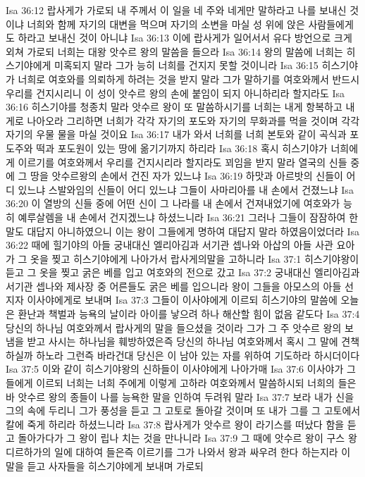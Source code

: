 Isa 36:12  랍사게가 가로되 내 주께서 이 일을 네 주와 네게만 말하라고 나를 보내신 것이냐 너희와 함께 자기의 대변을 먹으며 자기의 소변을 마실 성 위에 앉은 사람들에게도 하라고 보내신 것이 아니냐
Isa 36:13  이에 랍사게가 일어서서 유다 방언으로 크게 외쳐 가로되 너희는 대왕 앗수르 왕의 말씀을 들으라
Isa 36:14  왕의 말씀에 너희는 히스기야에게 미혹되지 말라 그가 능히 너희를 건지지 못할 것이니라
Isa 36:15  히스기야가 너희로 여호와를 의뢰하게 하려는 것을 받지 말라 그가 말하기를 여호와께서 반드시 우리를 건지시리니 이 성이 앗수르 왕의 손에 붙임이 되지 아니하리라 할지라도
Isa 36:16  히스기야를 청종치 말라 앗수르 왕이 또 말씀하시기를 너희는 내게 항복하고 내게로 나아오라 그리하면 너희가 각각 자기의 포도와 자기의 무화과를 먹을 것이며 각각 자기의 우물 물을 마실 것이요
Isa 36:17  내가 와서 너희를 너희 본토와 같이 곡식과 포도주와 떡과 포도원이 있는 땅에 옮기기까지 하리라
Isa 36:18  혹시 히스기야가 너희에게 이르기를 여호와께서 우리를 건지시리라 할지라도 꾀임을 받지 말라 열국의 신들 중에 그 땅을 앗수르왕의 손에서 건진 자가 있느냐
Isa 36:19  하맛과 아르밧의 신들이 어디 있느냐 스발와임의 신들이 어디 있느냐 그들이 사마리아를 내 손에서 건졌느냐
Isa 36:20  이 열방의 신들 중에 어떤 신이 그 나라를 내 손에서 건져내었기에 여호와가 능히 예루살렘을 내 손에서 건지겠느냐 하셨느니라
Isa 36:21  그러나 그들이 잠잠하여 한 말도 대답지 아니하였으니 이는 왕이 그들에게 명하여 대답지 말라 하였음이었더라
Isa 36:22  때에 힐기야의 아들 궁내대신 엘리아김과 서기관 셉나와 아삽의 아들 사관 요아가 그 옷을 찢고 히스기야에게 나아가서 랍사게의말을 고하니라
Isa 37:1  히스기야왕이 듣고 그 옷을 찢고 굵은 베를 입고 여호와의 전으로 갔고
Isa 37:2  궁내대신 엘리아김과 서기관 셉나와 제사장 중 어른들도 굵은 베를 입으니라 왕이 그들을 아모스의 아들 선지자 이사야에게로 보내며
Isa 37:3  그들이 이사야에게 이르되 히스기야의 말씀에 오늘은 환난과 책벌과 능욕의 날이라 아이를 낳으려 하나 해산할 힘이 없음 같도다
Isa 37:4  당신의 하나님 여호와께서 랍사게의 말을 들으셨을 것이라 그가 그 주 앗수르 왕의 보냄을 받고 사시는 하나님을 훼방하였은즉 당신의 하나님 여호와께서 혹시 그 말에 견책하실까 하노라 그런즉 바라건대 당신은 이 남아 있는 자를 위하여 기도하라 하시더이다
Isa 37:5  이와 같이 히스기야왕의 신하들이 이사야에게 나아가매
Isa 37:6  이사야가 그들에게 이르되 너희는 너희 주에게 이렇게 고하라 여호와께서 말씀하시되 너희의 들은바 앗수르 왕의 종들이 나를 능욕한 말을 인하여 두려워 말라
Isa 37:7  보라 내가 신을 그의 속에 두리니 그가 풍성을 듣고 그 고토로 돌아갈 것이며 또 내가 그를 그 고토에서 칼에 죽게 하리라 하셨느니라
Isa 37:8  랍사게가 앗수르 왕이 라기스를 떠났다 함을 듣고 돌아가다가 그 왕이 립나 치는 것을 만나니라
Isa 37:9  그 때에 앗수르 왕이 구스 왕 디르하가의 일에 대하여 들은즉 이르기를 그가 나와서 왕과 싸우려 한다 하는지라 이 말을 듣고 사자들을 히스기야에게 보내며 가로되

